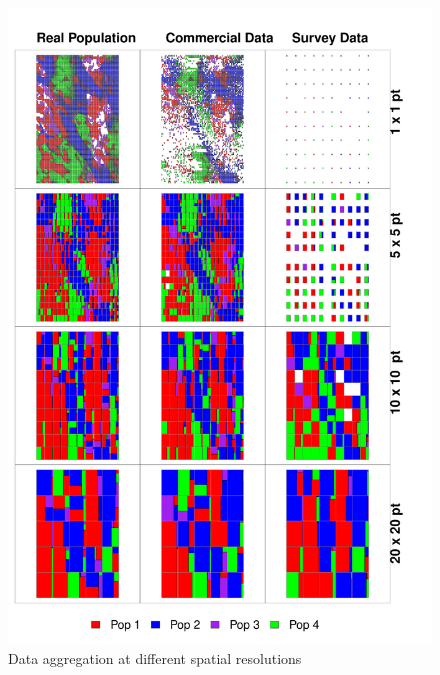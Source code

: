 \documentclass[review]{elsarticle}
\begin{document}
\begin{figure}[!ht]
	\includegraphics[width =\linewidth]{../analysis/Data_Aggregation_space}
	\caption{Data aggregation at different spatial resolutions}
	\label{fig:1}
\end{figure}	
\end{document}

